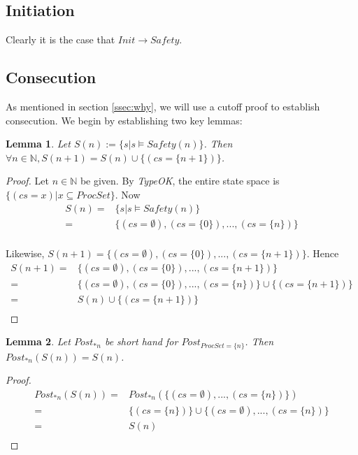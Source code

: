 \documentclass[12pt]{article}
\newtheorem{lemma}{Lemma}
\begin{document}
\subsection{Initiation}
Clearly it is the case that $Init \rightarrow Safety$.

\subsection{Consecution}
As mentioned in section \ref{ssec:why}, we will use a cutoff proof to establish consecution.  We begin by establishing two key lemmas:

\begin{lemma}
  Let $S(n) := \{s | s \models Safety(n)\}$.  Then $\forall n \in \mathbb{N}, S(n+1) = S(n) \cup \{(cs = \{n+1\})\}$.
\end{lemma}
\begin{proof}
  Let $n \in \mathbb{N}$ be given.  By \textit{TypeOK}, the entire state space is $\{(cs = x) | x \subseteq ProcSet\}$.  Now
  \begin{align*}
    S(n) = &\{s | s \models Safety(n)\}\\
    = &\{(cs = \emptyset), (cs = \{0\}), ..., (cs = \{n\})\}\\
  \end{align*}

  Likewise, $S(n+1) = \{(cs = \emptyset), (cs = \{0\}), ..., (cs = \{n+1\})\}$.  Hence
  \begin{align*}
    S(n+1) = &\{(cs = \emptyset), (cs = \{0\}), ..., (cs = \{n+1\})\}\\
    = &\{(cs = \emptyset), (cs = \{0\}), ..., (cs = \{n\})\} \cup \{(cs = \{n+1\})\}\\
    = &S(n) \cup \{(cs = \{n+1\})\}\\
  \end{align*}
\end{proof}

\begin{lemma}
  Let $Post_{*n}$ be short hand for $Post_{ProcSet=\{n\}}$.  Then $Post_{*n}(S(n)) = S(n)$.
\end{lemma}
\begin{proof}
  \begin{align*}
    Post_{*n}(S(n)) = &Post_{*n}(\{(cs = \emptyset),...,(cs = \{n\})\})\\
    = &\{(cs = \{n\})\} \cup \{(cs = \emptyset),...,(cs = \{n\})\}\\
    = &S(n)\\
  \end{align*}
\end{proof}
\end{document}
